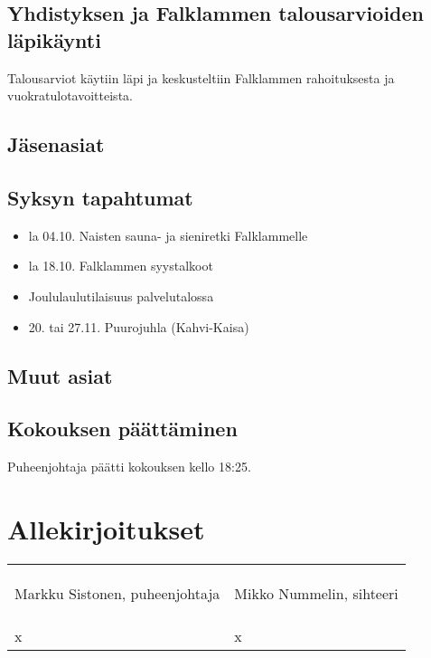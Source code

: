 \documentclass[a4paper,12pt]{article}
\begin{document}
\subsection{Yhdistyksen ja Falklammen talousarvioiden läpikäynti}
Talousarviot käytiin läpi ja keskusteltiin Falklammen rahoituksesta ja vuokratulotavoitteista.
\subsection{Jäsenasiat}
\subsection{Syksyn tapahtumat}
\begin{itemize}
\item{la 04.10. Naisten sauna- ja sieniretki Falklammelle}
\item{la 18.10. Falklammen syystalkoot}
\item{Joululaulutilaisuus palvelutalossa}
\item{20. tai 27.11. Puurojuhla (Kahvi-Kaisa)}
\end{itemize}
\subsection{Muut asiat}
\subsection{Kokouksen päättäminen}
Puheenjohtaja päätti kokouksen kello 18:25.
\section*{Allekirjoitukset}
\begin{flushleft}
\begin{tabular}{ll}
& \\
& \\
& \\
Markku Sistonen, puheenjohtaja &
Mikko Nummelin, sihteeri \\
& \\
& \\
& \\
x &
x
\end{tabular}
\end{flushleft}
\end{document}
